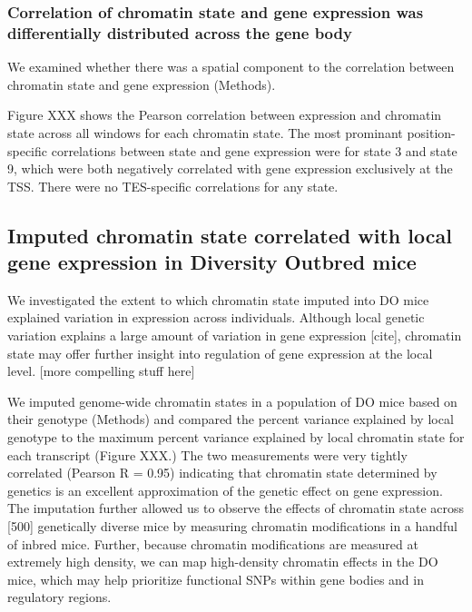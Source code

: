 \documentclass[10pt,letterpaper]{article}
\begin{document}
\hypertarget{correlation-of-chromatin-state-and-gene-expression-was-differentially-distributed-across-the-gene-body}{%
\subsubsection{Correlation of chromatin state and gene expression was
differentially distributed across the gene
body}\label{correlation-of-chromatin-state-and-gene-expression-was-differentially-distributed-across-the-gene-body}}

We examined whether there was a spatial component to the correlation
between chromatin state and gene expression (Methods).

Figure XXX shows the Pearson correlation between expression and
chromatin state across all windows for each chromatin state. The most
prominant position-specific correlations between state and gene
expression were for state 3 and state 9, which were both negatively
correlated with gene expression exclusively at the TSS. There were no
TES-specific correlations for any state.

\hypertarget{imputed-chromatin-state-correlated-with-local-gene-expression-in-diversity-outbred-mice}{%
\subsection{Imputed chromatin state correlated with local gene
expression in Diversity Outbred
mice}\label{imputed-chromatin-state-correlated-with-local-gene-expression-in-diversity-outbred-mice}}

We investigated the extent to which chromatin state imputed into DO mice
explained variation in expression across individuals. Although local
genetic variation explains a large amount of variation in gene
expression {[}cite{]}, chromatin state may offer further insight into
regulation of gene expression at the local level. {[}more compelling
stuff here{]}

We imputed genome-wide chromatin states in a population of DO mice based
on their genotype (Methods) and compared the percent variance explained
by local genotype to the maximum percent variance explained by local
chromatin state for each transcript (Figure XXX.) The two measurements
were very tightly correlated (Pearson R = 0.95) indicating that
chromatin state determined by genetics is an excellent approximation of
the genetic effect on gene expression. The imputation further allowed us
to observe the effects of chromatin state across {[}500{]} genetically
diverse mice by measuring chromatin modifications in a handful of inbred
mice. Further, because chromatin modifications are measured at extremely
high density, we can map high-density chromatin effects in the DO mice,
which may help prioritize functional SNPs within gene bodies and in
regulatory regions.
\end{document}

